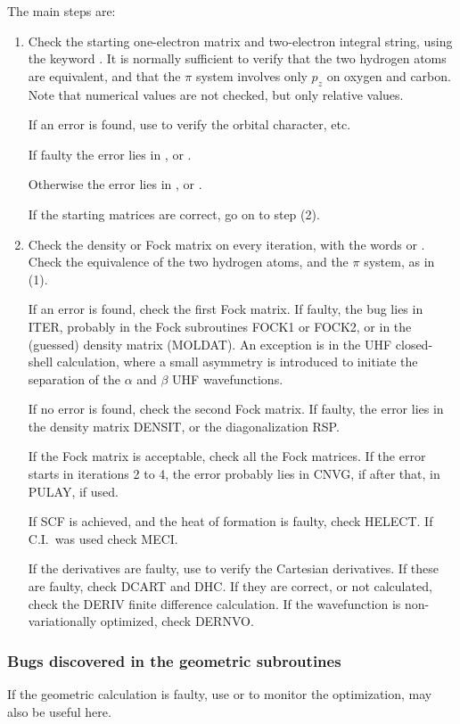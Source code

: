The main steps are:
\begin{enumerate}
\item Check  the  starting  one-electron  matrix  and   two-electron integral 
string, using the keyword .  It is normally sufficient to verify
that the two hydrogen atoms  are  equivalent,  and  that  the $\pi$ system 
involves  only $p_z$  on  oxygen  and carbon.  Note that numerical values are
not checked, but only relative values.

If an error is found, use  to verify the  orbital  character, etc.

If faulty the error lies in ,  or .

Otherwise the error lies in ,  or .

If the starting matrices are correct, go on to step (2).

\item Check the density or Fock matrix on every iteration,  with  the words
 or .  Check the equivalence of the  two hydrogen
atoms, and the $\pi$ system, as in (1).

If an error is found, check the first Fock matrix.  If faulty,  the bug  lies 
in ITER, probably in the Fock subroutines FOCK1 or FOCK2,  or in the (guessed)
density matrix (MOLDAT).  An exception is  in  the  UHF closed-shell 
calculation,  where  a  small  asymmetry  is introduced to initiate the
separation of the $\alpha$ and $\beta$ UHF wavefunctions.

If no error is found, check the second Fock matrix.  If faulty, the error lies
in the density matrix DENSIT, or the diagonalization RSP.

If the Fock matrix is acceptable, check all the Fock matrices.   If the  error
starts in iterations 2 to 4, the error probably lies in CNVG, if after that, in
PULAY, if used.

If SCF is achieved, and the heat  of  formation  is  faulty,  check HELECT. 
If C.I.\ was used check MECI.

If the derivatives are faulty, use  to  verify  the  Cartesian
derivatives.   If  these  are  faulty, check DCART and DHC.  If they are
correct,  or  not  calculated,  check  the   DERIV   finite   difference
calculation.   If the wavefunction is non-variationally optimized, check
DERNVO.
\end{enumerate}

\subsubsection{Bugs discovered in the geometric subroutines}
If the geometric calculation is faulty, use  or   to 
monitor  the optimization,  may also be useful here.

